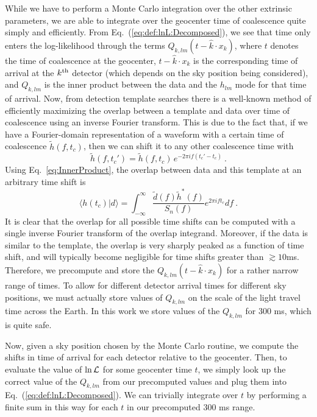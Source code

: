 While we have to perform a Monte Carlo integration over the other extrinsic parameters, we are able to
integrate over the geocenter time of coalescence quite simply and efficiently.
From Eq.~(\ref{eq:def:lnL:Decomposed}), we see that time only enters the log-likelihood through the terms
$Q_{k,lm}(t - \hat{k} \cdot x_k)$, where $t$ denotes the time of coalescence at the geocenter, $t - \hat{k} \cdot x_k$ is
the corresponding time of arrival at the $k^{\rm th}$ detector (which depends on the sky position being considered),
and $Q_{k,lm}$ is the inner product between the data and the $h_{lm}$ mode for that time of arrival.
Now, from detection template searches there is a well-known method of efficiently maximizing the overlap 
between a template and data over time of coalescence using an inverse Fourier transform. This is due to the fact that,
if we have a Fourier-domain representation of a waveform with a certain time of coalescence $\tilde{h}(f,t_c)$,
then we can shift it to any other coalescence time with
\begin{equation}
\tilde{h}(f,t_c') = \tilde{h}(f,t_c) \, e^{-2\pi i f (t_c'-t_c)}\ .
\end{equation}
Using Eq.~\ref{eq:InnerProduct}, the overlap between data and this template at an arbitrary time shift is
\begin{equation}
\langle h(t_c) | d \rangle = \int_{-\infty}^{\infty} \frac{\tilde{d}(f) \tilde{h}^*(f)}{S_n(f)} e^{2\pi i f t_c} df \ .
\end{equation}
It is clear that the overlap for all possible time shifts can be computed with a single inverse Fourier transform
of the overlap integrand.
Moreover, if the data is similar to the template, the overlap is very sharply peaked as a function of time shift, 
and will typically become negligible for time shifts greater than $\gtrsim 10$ms. 
Therefore, we precompute and store the $Q_{k,lm}(t - \hat{k} \cdot x_k)$ for a rather narrow range of times.
To allow for different detector arrival times for different sky positions, we must actually store values of
$Q_{k,lm}$ on the scale of the light travel time across the Earth. In this work we store values of the 
$Q_{k,lm}$ for $300$ ms, which is quite safe.
 
Now, given a sky position chosen by the Monte Carlo routine, we compute the shifts in time of arrival for each
detector relative to the geocenter. Then, to evaluate the value of $\ln {\cal L}$ for some geocenter time $t$,
we simply look up the correct value of the $Q_{k,lm}$ from our precomputed values and plug them
into Eq.~(\ref{eq:def:lnL:Decomposed}).
We can trivially integrate over $t$ by performing a finite sum in this way 
for each $t$ in our precomputed $300$ ms range.





